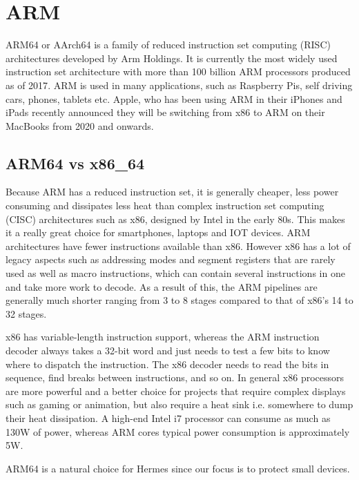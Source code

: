 \section{ARM}
ARM64 or AArch64 is a family of reduced instruction set computing (RISC) architectures developed by Arm Holdings.
It is currently the most widely used instruction set architecture with more than 100 billion ARM processors produced as of 2017\cite{ARM_sales}. 
ARM is used in many applications, such as Raspberry Pis, self driving cars, phones, tablets etc. Apple, who has been using ARM in their iPhones and iPads recently announced they will be switching from x86 to ARM on their MacBooks from 2020 and onwards\cite{ARM_cpus_2020}.

\subsection{ARM64 vs x86\_64}
Because ARM has a reduced instruction set, it is generally cheaper, less power consuming and dissipates less heat than complex instruction set computing (CISC) architectures such as x86, designed by Intel in the early 80s. This makes it a really great choice for smartphones, laptops and IOT devices.
ARM architectures have fewer instructions available than x86. However x86 has a lot of legacy aspects such as addressing modes and segment registers that are rarely used as well as macro instructions, which can contain several instructions in one and take more work to decode. As a result of this, the ARM pipelines are generally much shorter ranging from 3 to 8 stages compared to that of x86's 14 to 32 stages.

x86 has variable-length instruction support, whereas the ARM instruction decoder always takes a 32-bit word and just needs to test a few bits to know where to dispatch the instruction. The x86 decoder needs to read the bits in sequence, find breaks between instructions, and so on.  
In general x86 processors are more powerful and a better choice for projects that require complex displays such as gaming or animation, but also require a heat sink i.e. somewhere to dump their heat dissipation. A high-end Intel i7 processor can consume as much as 130W of power, whereas ARM cores typical power consumption is approximately 5W.

ARM64 is a natural choice for Hermes since our focus is to protect small devices.
